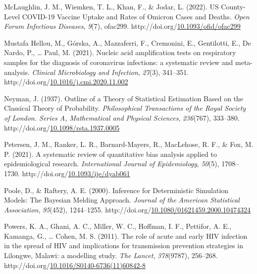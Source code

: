 \documentclass[12pt,twoside]{smiththesis}
\newlength{\cslhangindent}
\newenvironment{CSLReferences}[2] %
 {%
\setlength{\parindent}{0pt}
\ifodd #1 \everypar{\setlength{\hangindent}{\cslhangindent}}\ignorespaces\fi
\ifnum #2 > 0
\setlength{\parskip}{#2\baselineskip}
  \fi
}%
{}
\begin{document}
\begin{CSLReferences}{1}{0}
\leavevmode{}%
McLaughlin, J. M., Wiemken, T. L., Khan, F., \& Jodar, L. (2022). US County-Level COVID-19 Vaccine Uptake and Rates of Omicron Cases and Deaths. \emph{Open Forum Infectious Diseases}, \emph{9}(7), ofac299. http://doi.org/\href{https://doi.org/10.1093/ofid/ofac299}{10.1093/ofid/ofac299}

\leavevmode{}%
Mustafa Hellou, M., Górska, A., Mazzaferri, F., Cremonini, E., Gentilotti, E., De Nardo, P., \ldots{} Paul, M. (2021). Nucleic acid amplification tests on respiratory samples for the diagnosis of coronavirus infections: a systematic review and meta-analysis. \emph{Clinical Microbiology and Infection}, \emph{27}(3), 341--351. http://doi.org/\href{https://doi.org/10.1016/j.cmi.2020.11.002}{10.1016/j.cmi.2020.11.002}

\leavevmode{}%
Neyman, J. (1937). Outline of a Theory of Statistical Estimation Based on the Classical Theory of Probability. \emph{Philosophical Transactions of the Royal Society of London. Series A, Mathematical and Physical Sciences}, \emph{236}(767), 333--380. http://doi.org/\href{https://doi.org/10.1098/rsta.1937.0005}{10.1098/rsta.1937.0005}

\leavevmode{}%
Petersen, J. M., Ranker, L. R., Barnard-Mayers, R., MacLehose, R. F., \& Fox, M. P. (2021). A systematic review of quantitative bias analysis applied to epidemiological research. \emph{International Journal of Epidemiology}, \emph{50}(5), 1708--1730. http://doi.org/\href{https://doi.org/10.1093/ije/dyab061}{10.1093/ije/dyab061}

\leavevmode{}%
Poole, D., \& Raftery, A. E. (2000). Inference for Deterministic Simulation Models: The Bayesian Melding Approach. \emph{Journal of the American Statistical Association}, \emph{95}(452), 1244--1255. http://doi.org/\href{https://doi.org/10.1080/01621459.2000.10474324}{10.1080/01621459.2000.10474324}

\leavevmode{}%
Powers, K. A., Ghani, A. C., Miller, W. C., Hoffman, I. F., Pettifor, A. E., Kamanga, G., \ldots{} Cohen, M. S. (2011). The role of acute and early HIV infection in the spread of HIV and implications for transmission prevention strategies in Lilongwe, Malawi: a modelling study. \emph{The Lancet}, \emph{378}(9787), 256--268. http://doi.org/\href{https://doi.org/10.1016/S0140-6736(11)60842-8}{10.1016/S0140-6736(11)60842-8}


\end{CSLReferences}
\end{document}

